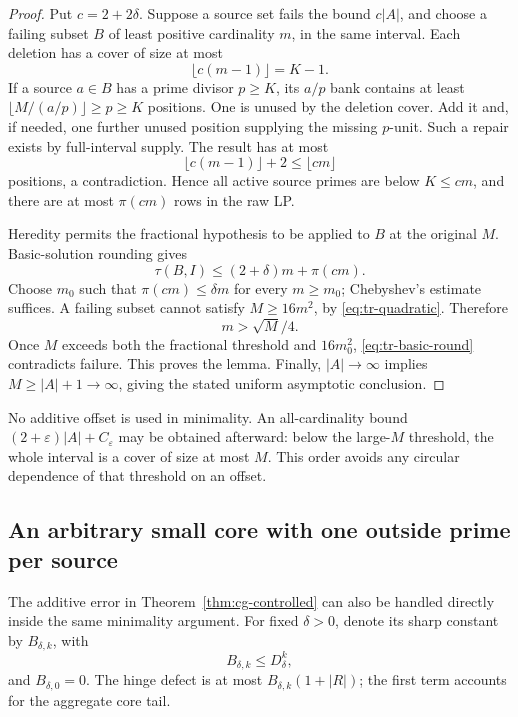 \begin{proof}
Put $c=2+2\delta$. Suppose a source set fails the bound $c|A|$, and
choose a failing subset $B$ of least positive cardinality $m$, in the
same interval. Each deletion has a cover of size at most
\[
 \lfloor c(m-1)\rfloor=K-1.
\]
If a source $a\in B$ has a prime divisor $p\ge K$, its $a/p$ bank
contains at least $\lfloor M/(a/p)\rfloor\ge p\ge K$ positions.
One is unused by the deletion cover. Add it and, if needed, one further
unused position supplying the missing $p$-unit. Such a repair exists by
full-interval supply. The result has at most
\[
 \lfloor c(m-1)\rfloor+2\le\lfloor cm\rfloor
\]
positions, a contradiction. Hence all active source primes are below
$K\le cm$, and there are at most $\pi(cm)$ rows in the raw LP.

Heredity permits the fractional hypothesis to be applied to $B$ at the
original $M$. Basic-solution rounding gives
\begin{equation}
 \tau(B,I)\le(2+\delta)m+\pi(cm).
 \label{eq:tr-basic-round}
\end{equation}
Choose $m_0$ such that $\pi(cm)\le\delta m$ for every $m\ge m_0$;
Chebyshev's estimate suffices. A failing subset cannot satisfy
$M\ge16m^2$, by \eqref{eq:tr-quadratic}. Therefore
\begin{equation}
 m>\sqrt M/4.
 \label{eq:tr-minimal-large}
\end{equation}
Once $M$ exceeds both the fractional threshold and $16m_0^2$,
\eqref{eq:tr-basic-round} contradicts failure. This proves the lemma.
Finally, $|A|\to\infty$ implies $M\ge|A|+1\to\infty$, giving the
stated uniform asymptotic conclusion.
\end{proof}

No additive offset is used in minimality. An all-cardinality bound
$(2+\varepsilon)|A|+C_\varepsilon$ may be obtained afterward: below the
large-$M$ threshold, the whole interval is a cover of size at most $M$.
This order avoids any circular dependence of that threshold on an offset.

\subsection{An arbitrary small core with one outside prime per source}

The additive error in Theorem~\ref{thm:cg-controlled} can also be handled
directly inside the same minimality argument. For fixed $\delta>0$, denote
its sharp constant by $B_{\delta,k}$, with
\begin{equation}
 B_{\delta,k}\le D_\delta^k,
 \label{eq:tr-error-growth}
\end{equation}
and $B_{\delta,0}=0$. The hinge defect is at most
$B_{\delta,k}(1+|R|)$; the first term accounts for the aggregate core tail.

